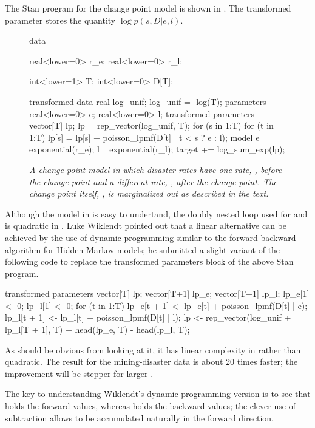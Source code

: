 The Stan program for the change point model is shown in
.  The transformed parameter
 stores the quantity $\log p(s,D|e,l)$.
%
\begin{figure}
\begin{stancode}
data {
  real<lower=0> r_e;
  real<lower=0> r_l;

  int<lower=1> T;
  int<lower=0> D[T];
}
transformed data {
  real log_unif;
  log_unif = -log(T);
}
parameters {
  real<lower=0> e;
  real<lower=0> l;
}
transformed parameters {
  vector[T] lp;
  lp = rep_vector(log_unif, T);
  for (s in 1:T)
    for (t in 1:T)
      lp[s] = lp[s] + poisson_lpmf(D[t] | t < s ? e : l);
}
model {
  e ~ exponential(r_e);
  l ~ exponential(r_l);
  target += log_sum_exp(lp);
}    
\end{stancode}
\vspace*{-6pt}
\caption{\small\it A change point model in which disaster rates
   have one rate, , before the change point and a
  different rate, , after the change point.  The change point
  itself, , is marginalized out as described in the
  text.}\label{change-point-model.figure}
\end{figure}

Although the model in  is easy to
undertand, the doubly nested loop used for  and  is
quadratic in .  Luke Wiklendt pointed out that a linear
alternative can be achieved by the use of dynamic programming similar
to the forward-backward algorithm for Hidden Markov models;  he
submitted a slight variant of the following code to replace the
transformed parameters block of the above Stan program.
%
\begin{stancode}
transformed parameters {
    vector[T] lp;
    {
      vector[T+1] lp_e;
      vector[T+1] lp_l;
      lp_e[1] <- 0;
      lp_l[1] <- 0;
      for (t in 1:T) {
        lp_e[t + 1] <- lp_e[t] + poisson_lpmf(D[t] | e);
        lp_l[t + 1] <- lp_l[t] + poisson_lpmf(D[t] | l);
      }
      lp <- rep_vector(log_unif + lp_l[T + 1], T) + head(lp_e, T) - head(lp_l, T);
    }
  }
\end{stancode}
%
As should be obvious from looking at it, it has linear complexity in
 rather than quadratic.  The result for the mining-disaster
data is about 20 times faster;  the improvement will be stepper for
larger .

The key to understanding Wiklendt's dynamic programming version is to
see that  holds the forward values, whereas
 holds the backward values; the
clever use of subtraction allows  to be accumulated
naturally in the forward direction.


